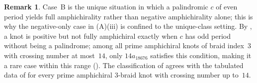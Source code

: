 \documentclass[11pt]{article}
\theoremstyle{definition}
\newtheorem{remark}[remark]{Remark}
\begin{document}
\begin{remark}\label{rmk:case-B-and-data}
Case~B is the unique situation in which a palindromic $c$ of even
period yields full amphichirality rather than negative amphichirality
alone; this is why the negative-only case in
\textup{(A)(iii)} is confined to the unique-class setting. By , a knot is positive but not fully amphichiral exactly
when $c$ has odd period without being a palindrome; among all prime amphichiral knots
of braid index~$3$ with crossing number at most~$14$, only $14a_{18676}$
satisfies this condition, making it a rare case within this range
\textup{(}\textup{)}. The classification of
 agrees with the tabulated data of
 for every prime amphichiral $3$-braid knot with
crossing number up to~$14$.
\end{remark}

\newpage







\appendix
{}
\end{document}
